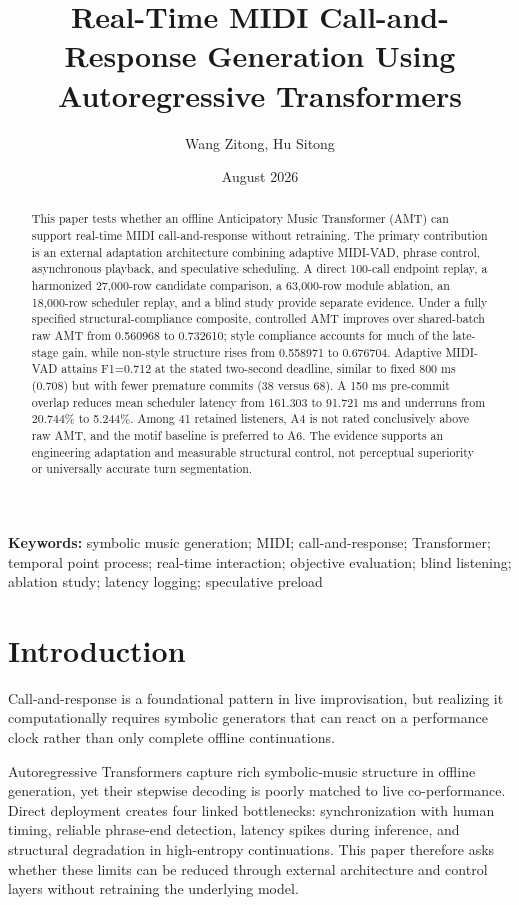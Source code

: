 \documentclass[11pt,a4paper]{article}
\title{Real-Time MIDI Call-and-Response Generation Using Autoregressive Transformers}
\author{Wang Zitong, Hu Sitong}
\date{August 2026}
\begin{document}
\maketitle

\begin{abstract}
This paper tests whether an offline Anticipatory Music Transformer (AMT) can support real-time MIDI call-and-response without retraining. The primary contribution is an external adaptation architecture combining adaptive MIDI-VAD, phrase control, asynchronous playback, and speculative scheduling. A direct 100-call endpoint replay, a harmonized 27,000-row candidate comparison, a 63,000-row module ablation, an 18,000-row scheduler replay, and a blind study provide separate evidence. Under a fully specified structural-compliance composite, controlled AMT improves over shared-batch raw AMT from 0.560968 to 0.732610; style compliance accounts for much of the late-stage gain, while non-style structure rises from 0.558971 to 0.676704. Adaptive MIDI-VAD attains F1=0.712 at the stated two-second deadline, similar to fixed 800 ms (0.708) but with fewer premature commits (38 versus 68). A 150 ms pre-commit overlap reduces mean scheduler latency from 161.303 to 91.721 ms and underruns from 20.744\% to 5.244\%. Among 41 retained listeners, A4 is not rated conclusively above raw AMT, and the motif baseline is preferred to A6. The evidence supports an engineering adaptation and measurable structural control, not perceptual superiority or universally accurate turn segmentation.
\end{abstract}


\noindent\textbf{Keywords:} symbolic music generation; MIDI; call-and-response; Transformer; temporal point process; real-time interaction; objective evaluation; blind listening; ablation study; latency logging; speculative preload

\section{Introduction}
\label{sec:introduction}
Call-and-response is a foundational pattern in live improvisation, but realizing it computationally requires symbolic generators that can react on a performance clock rather than only complete offline continuations.

Autoregressive Transformers capture rich symbolic-music structure in offline generation, yet their stepwise decoding is poorly matched to live co-performance. Direct deployment creates four linked bottlenecks: synchronization with human timing, reliable phrase-end detection, latency spikes during inference, and structural degradation in high-entropy continuations. This paper therefore asks whether these limits can be reduced through external architecture and control layers without retraining the underlying model.
\end{document}
